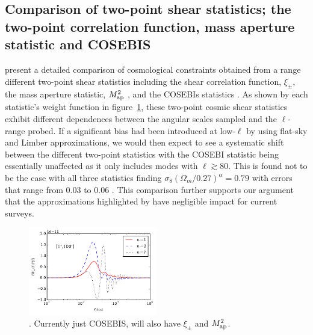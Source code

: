 \subsection{Comparison of two-point shear statistics; the two-point correlation function, mass aperture statistic and COSEBIS}
\citet{kilbinger/etal:2013} present a detailed comparison of cosmological constraints obtained from a range different two-point shear statistics including the shear correlation function, $\xi_\pm$, the mass aperture statistic, $M_ {\rm ap}^2$ \citep{schneider/etal:1998}, and the COSEBIs statistics \citep{schneider/etal:2010}.  As shown by each statistic's weight function in figure~\ref{fig:filters}, these two-point cosmic shear statistics exhibit different dependences between the angular scales sampled and the $\ell$-range probed.   If a significant bias had been introduced at low-$\ell$ by using flat-sky and Limber approximations, we would then expect to see a systematic shift between the different two-point statistics with the COSEBI statistic being essentially unaffected as it only includes modes with $\ell \gtrsim 80$.  This is found not to be the case with all three statistics finding $\sigma_8 (\Omega_m/0.27)^\alpha = 0.79$ with errors that range from $0.03$ to $0.06$ \citep[see Table 5 of][]{kilbinger/etal:2013}.  This comparison further supports our argument that the approximations highlighted by \citet{kitching/etal:2016} have negligible impact for current surveys.

\begin{figure}[htb]
\begin{center}
\includegraphics[width=0.5\textwidth]{figures/ellWnPell1-100.pdf}
\caption{ \label{fig:filters}.  Currently just COSEBIS, will also have $\xi_\pm$ and $M_{\rm ap}^2$.}
\end{center}
\end{figure}





